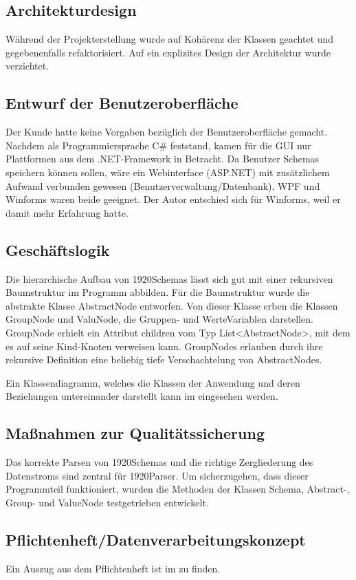 \subsection{Architekturdesign}
\label{sec:Architekturdesign}
Während der Projekterstellung wurde auf Kohärenz der Klassen geachtet und gegebenenfalls refaktorisiert. Auf ein explizites Design der Architektur wurde verzichtet.

\subsection{Entwurf der Benutzeroberfläche}
\label{sec:Benutzeroberflaeche}
Der Kunde hatte keine Vorgaben bezüglich der Benutzeroberfläche gemacht. 
Nachdem als Programmiersprache C\# feststand, kamen für die \ac{GUI} nur  Plattformen aus dem .NET-Framework in Betracht. Da Benutzer Schemas speichern können sollen, wäre ein Webinterface (ASP.NET) mit zusätzlichem Aufwand verbunden gewesen (Benutzerverwaltung/Datenbank). \ac{WPF} und Winforms waren beide geeignet. Der Autor entschied sich für Winforms, weil er damit mehr Erfahrung hatte.

\subsection{Geschäftslogik}
\label{sec:Geschaeftslogik}
Die hierarchische Aufbau von 1920Schemas lässt sich gut mit einer rekursiven Baumstruktur im Programm abbilden. 
Für die Baumstruktur wurde die abstrakte Klasse AbstractNode entworfen. Von dieser Klasse erben die Klassen GroupNode und ValuNode, die Gruppen- und WerteVariablen darstellen. GroupNode erhielt ein Attribut children vom Typ List<AbstractNode>, mit dem es auf seine Kind-Knoten verweisen kann. GroupNodes erlauben durch ihre rekursive Definition eine beliebig tiefe Verschachtelung von AbstractNodes.

Ein Klassendiagramm, welches die Klassen der Anwendung und deren Beziehungen untereinander darstellt kann im  eingesehen werden.


\subsection{Maßnahmen zur Qualitätssicherung}
\label{sec:Qualitaetssicherung}
Das korrekte Parsen von 1920Schemas und die richtige Zergliederung des Datenstroms sind zentral für 1920Parser. Um sicherzugehen, dass dieser Programmteil funktioniert,  wurden die Methoden der Klassen Schema, Abstract-, Group- und ValueNode  testgetrieben entwickelt.

\subsection{Pflichtenheft/Datenverarbeitungskonzept}
\label{sec:Pflichtenheft}
Ein Auszug aus dem Pflichtenheft ist im  zu finden.


